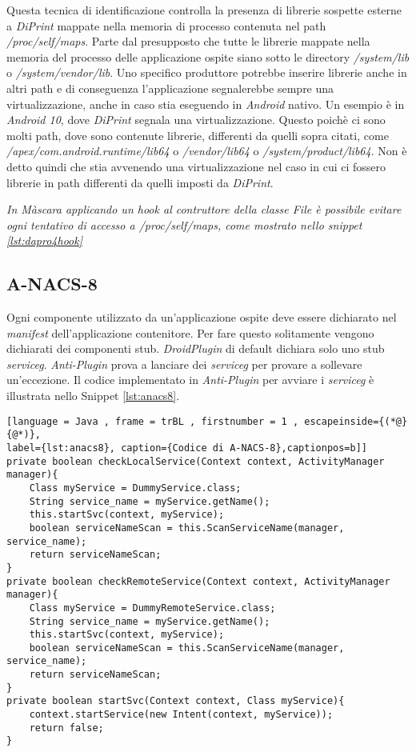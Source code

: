 Questa tecnica di identificazione controlla la presenza di librerie sospette esterne a \emph{DiPrint} mappate nella memoria di processo contenuta nel path \emph{/proc/self/maps}. 
Parte dal presupposto che tutte le librerie mappate nella memoria del processo delle applicazione ospite siano sotto le directory \emph{/system/lib} o \emph{/system/vendor/lib}.
Uno specifico produttore potrebbe inserire librerie anche in altri path e di conseguenza l’applicazione segnalerebbe sempre una virtualizzazione, anche in caso stia eseguendo in \emph{Android} nativo.
Un esempio è in \emph{Android 10}, dove \emph{DiPrint} segnala una virtualizzazione. Questo poichè ci sono molti path, dove sono contenute librerie, differenti da quelli sopra citati, come \emph{/apex/com.android.runtime/lib64} o \emph{/vendor/lib64} o \emph{/system/product/lib64}.
Non è detto quindi che stia avvenendo una virtualizzazione nel caso in cui ci fossero librerie in path differenti da quelli imposti da \emph{DiPrint}.

\emph{In Màscara applicando un hook al contruttore della classe File è possibile evitare ogni tentativo di accesso a /proc/self/maps, come mostrato nello snippet \ref{lst:dapro4hook}}





\newpage
\subsection*{A-NACS-8}
\label{a-nacs-8}

Ogni componente utilizzato da un'applicazione ospite deve essere dichiarato nel \emph{manifest} dell'applicazione contenitore. Per fare questo solitamente vengono dichiarati dei componenti stub.
\emph{DroidPlugin} di default dichiara solo uno stub \emph{\gls{serviceg}}\glsfirstoccur.
\emph{Anti-Plugin} prova  a lanciare dei \emph{\gls{serviceg}} per provare a sollevare un'eccezione.
Il codice implementato in \emph{Anti-Plugin} per avviare i \emph{\gls{serviceg}} è illustrata nello Snippet \ref{lst:anacs8}.

\begin{lstlisting}[language = Java , frame = trBL , firstnumber = 1 , escapeinside={(*@}{@*)},
label={lst:anacs8}, caption={Codice di A-NACS-8},captionpos=b]]
private boolean checkLocalService(Context context, ActivityManager manager){
    Class myService = DummyService.class;
    String service_name = myService.getName();
    this.startSvc(context, myService);
    boolean serviceNameScan = this.ScanServiceName(manager, service_name);
    return serviceNameScan;
}
private boolean checkRemoteService(Context context, ActivityManager manager){
    Class myService = DummyRemoteService.class;
    String service_name = myService.getName();
    this.startSvc(context, myService);
    boolean serviceNameScan = this.ScanServiceName(manager, service_name);
    return serviceNameScan;
}
private boolean startSvc(Context context, Class myService){
    context.startService(new Intent(context, myService));
    return false;
}
\end{lstlisting}

